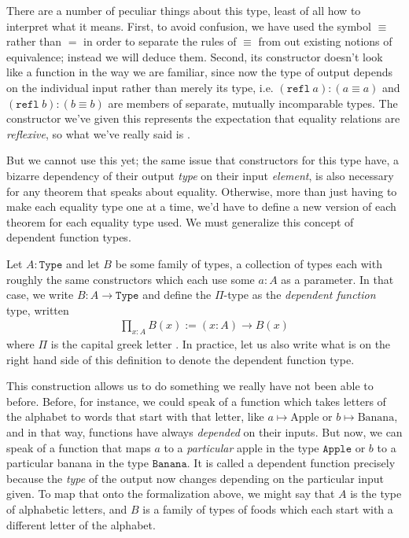 \documentclass[11pt]{article}
\begin{document}
There are a number of peculiar things about this type, least of all how to interpret what it means. First, to avoid confusion, we have used the symbol $\equiv$ rather than $=$ in order to separate the rules of $\equiv$ from out existing notions of equivalence; instead we will deduce them. Second, its constructor doesn't look like a function in the way we are familiar, since now the type of output depends on the individual input rather than merely its type, i.e. $(\mathtt{refl} \hspace{3pt} a) \colon (a \equiv a)$ and $(\mathtt{refl} \hspace{3pt} b) \colon (b \equiv b)$ are members of separate, mutually incomparable types. The constructor we've given this represents the expectation that equality relations are \emph{reflexive}, so what we've really said is .

But we cannot use this yet; the same issue that constructors for this type have, a bizarre dependency of their output \emph{type} on their input \emph{element}, is also necessary for any theorem that speaks about equality. Otherwise, more than just having to make each equality type one at a time, we'd have to define a new version of each theorem for each equality type used. We must generalize this concept of dependent function types.

\begin{definition}
Let $A \colon \mathtt{Type}$ and let $B$ be some family of types, a collection of types each with roughly the same constructors which each use some $a \colon A$ as a parameter. In that case, we write $B \colon A \to \mathtt{Type}$ and define the $\Pi$-type as the \emph{dependent function} type, written \begin{gather*}
\prod_{x : A} B(x) := (x \colon A) \to B(x)
\end{gather*}
where $\Pi$ is the capital greek letter . In practice, let us also write what is on the right hand side of this definition to denote the dependent function type.
\end{definition}

This construction allows us to do something we really have not been able to before. Before, for instance, we could speak of a function which takes letters of the alphabet to words that start with that letter, like $a \mapsto \text{Apple}$ or $b \mapsto \text{Banana}$, and in that way, functions have always \emph{depended} on their inputs. But now, we can speak of a function that maps $a$ to a \emph{particular} apple in the type $\mathtt{Apple}$ or $b$ to a particular banana in the type $\mathtt{Banana}$. It is called a dependent function precisely because the \emph{type} of the output now changes depending on the particular input given. To map that onto the formalization above, we might say that $A$ is the type of alphabetic letters, and $B$ is a family of types of foods which each start with a different letter of the alphabet.
\end{document}
